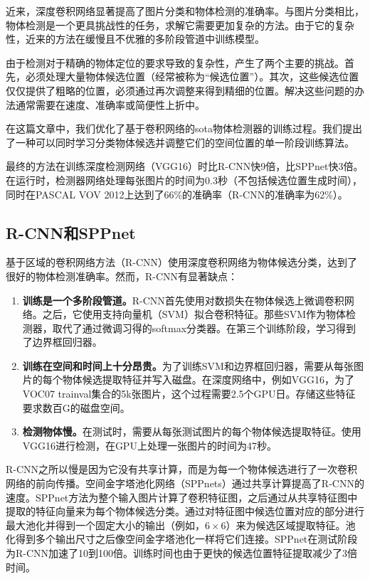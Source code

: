 \documentclass[../main]{subfile}
\begin{document}
近来，深度卷积网络显著提高了图片分类和物体检测的准确率。与图片分类相比，物体检测是一个更具挑战性的任务，求解它需要更加复杂的方法。由于它的复杂性，近来的方法在缓慢且不优雅的多阶段管道中训练模型。

由于检测对于精确的物体定位的要求导致的复杂性，产生了两个主要的挑战。首先，必须处理大量物体候选位置（经常被称为“候选位置”）。其次，这些候选位置仅仅提供了粗略的位置，必须通过再次调整来得到精细的位置。解决这些问题的办法通常需要在速度、准确率或简便性上折中。

在这篇文章中，我们优化了基于卷积网络的sota物体检测器的训练过程。我们提出了一种可以同时学习分类物体候选并调整它们的空间位置的单一阶段训练算法。

最终的方法在训练深度检测网络（VGG16\cite{vgg}）时比R-CNN\cite{rcnn}快9倍，比SPPnet\cite{spp}快3倍。在运行时，检测器网络处理每张图片的时间为0.3秒（不包括候选位置生成时间），同时在PASCAL VOV 2012上达到了66\%的准确率（R-CNN的准确率为62\%）。

\subsection{R-CNN和SPPnet}

基于区域的卷积网络方法（R-CNN）\cite{rcnn}使用深度卷积网络为物体候选分类，达到了很好的物体检测准确率。然而，R-CNN有显著缺点：
\begin{enumerate}
    \item \textbf{训练是一个多阶段管道。}R-CNN首先使用对数损失在物体候选上微调卷积网络。之后，它使用支持向量机（SVM）拟合卷积特征。那些SVM作为物体检测器，取代了通过微调习得的softmax分类器。在第三个训练阶段，学习得到了边界框回归器。
    \item \textbf{训练在空间和时间上十分昂贵。}为了训练SVM和边界框回归器，需要从每张图片的每个物体候选提取特征并写入磁盘。在深度网络中，例如VGG16，为了VOC07 trainval集合的5k张图片，这个过程需要2.5个GPU日。存储这些特征要求数百G的磁盘空间。
    \item \textbf{检测物体慢。}在测试时，需要从每张测试图片的每个物体候选提取特征。使用VGG16进行检测，在GPU上处理一张图片的时间为47秒。
\end{enumerate}

R-CNN之所以慢是因为它没有共享计算，而是为每一个物体候选进行了一次卷积网络的前向传播。空间金字塔池化网络（SPPnets）\cite{spp}通过共享计算提高了R-CNN的速度。SPPnet方法为整个输入图片计算了卷积特征图，之后通过从共享特征图中提取的特征向量来为每个物体候选分类。通过对特征图中候选位置对应的部分进行最大池化并得到一个固定大小的输出（例如，$6\times 6$）来为候选区域提取特征。池化得到多个输出尺寸之后像空间金字塔池化\cite{sp}一样将它们连接。SPPnet在测试阶段为R-CNN加速了10到100倍。训练时间也由于更快的候选位置特征提取减少了3倍时间。
\end{document}
